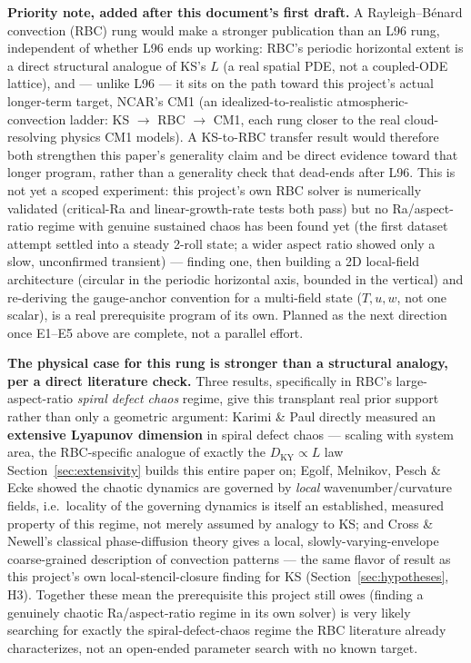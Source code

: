 \documentclass[11pt]{article}
\begin{document}
\textbf{Priority note, added after this document's first draft.} A
Rayleigh--B\'enard convection (RBC) rung would make a stronger
publication than an L96 rung, independent of whether L96 ends up
working: RBC's periodic horizontal extent is a direct structural
analogue of KS's $L$ (a real spatial PDE, not a coupled-ODE lattice),
and --- unlike L96 --- it sits on the path toward this project's actual
longer-term target, NCAR's CM1 (an idealized-to-realistic
atmospheric-convection ladder: KS $\to$ RBC $\to$ CM1, each rung
closer to the real cloud-resolving physics CM1 models). A KS-to-RBC
transfer result would therefore both strengthen this paper's generality
claim and be direct evidence toward that longer program, rather than a
generality check that dead-ends after L96. This is not yet a scoped
experiment: this project's own RBC solver is numerically validated
(critical-Ra and linear-growth-rate tests both pass) but no
Ra/aspect-ratio regime with genuine sustained chaos has been found yet
(the first dataset attempt settled into a steady 2-roll state; a wider
aspect ratio showed only a slow, unconfirmed transient) --- finding
one, then building a 2D local-field architecture (circular in the
periodic horizontal axis, bounded in the vertical) and re-deriving the
gauge-anchor convention for a multi-field state ($T,u,w$, not one
scalar), is a real prerequisite program of its own. Planned as the next
direction once E1--E5 above are complete, not a parallel effort.

\textbf{The physical case for this rung is stronger than a structural
analogy, per a direct literature check.} Three results, specifically in
RBC's large-aspect-ratio \emph{spiral defect chaos} regime, give this
transplant real prior support rather than only a geometric argument:
Karimi \& Paul \cite{karimipaul2010} directly measured an
\textbf{extensive Lyapunov dimension} in spiral defect chaos --- scaling
with system area, the RBC-specific analogue of exactly the
$D_{\mathrm{KY}}\propto L$ law Section~\ref{sec:extensivity} builds this
entire paper on; Egolf, Melnikov, Pesch \& Ecke \cite{egolf2000} showed
the chaotic dynamics are governed by \emph{local} wavenumber/curvature
fields, i.e.\ locality of the governing dynamics is itself an
established, measured property of this regime, not merely assumed by
analogy to KS; and Cross \& Newell's classical phase-diffusion theory
\cite{crossnewell1984} gives a local, slowly-varying-envelope
coarse-grained description of convection patterns --- the same flavor
of result as this project's own local-stencil-closure finding for KS
(Section~\ref{sec:hypotheses}, H3). Together these mean the prerequisite
this project still owes (finding a genuinely chaotic Ra/aspect-ratio
regime in its own solver) is very likely searching for exactly the
spiral-defect-chaos regime the RBC literature already characterizes,
not an open-ended parameter search with no known target.
\end{document}

